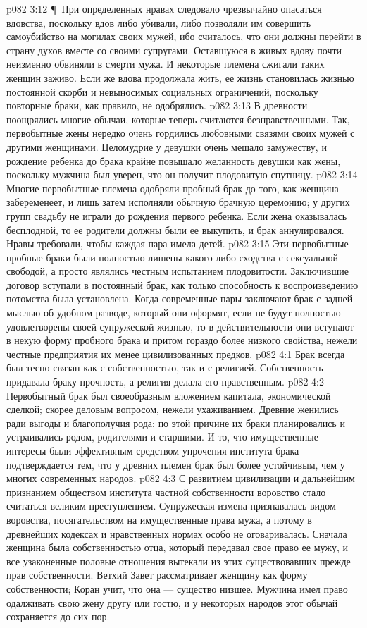 \vs p082 3:12 \P\ При определенных нравах следовало чрезвычайно опасаться вдовства, поскольку вдов либо убивали, либо позволяли им совершить самоубийство на могилах своих мужей, ибо считалось, что они должны перейти в страну духов вместе со своими супругами. Оставшуюся в живых вдову почти неизменно обвиняли в смерти мужа. И некоторые племена сжигали таких женщин заживо. Если же вдова продолжала жить, ее жизнь становилась жизнью постоянной скорби и невыносимых социальных ограничений, поскольку повторные браки, как правило, не одобрялись.
\vs p082 3:13 В древности поощрялись многие обычаи, которые теперь считаются безнравственными. Так, первобытные жены нередко очень гордились любовными связями своих мужей с другими женщинами. Целомудрие у девушки очень мешало замужеству, и рождение ребенка до брака крайне повышало желанность девушки как жены, поскольку мужчина был уверен, что он получит плодовитую спутницу.
\vs p082 3:14 Многие первобытные племена одобряли пробный брак до того, как женщина забеременеет, и лишь затем исполняли обычную брачную церемонию; у других групп свадьбу не играли до рождения первого ребенка. Если жена оказывалась бесплодной, то ее родители должны были ее выкупить, и брак аннулировался. Нравы требовали, чтобы каждая пара имела детей.
\vs p082 3:15 Эти первобытные пробные браки были полностью лишены какого\hyp{}либо сходства с сексуальной свободой, а просто являлись честным испытанием плодовитости. Заключившие договор вступали в постоянный брак, как только способность к воспроизведению потомства была установлена. Когда современные пары заключают брак с задней мыслью об удобном разводе, который они оформят, если не будут полностью удовлетворены своей супружеской жизнью, то в действительности они вступают в некую форму пробного брака и притом гораздо более низкого свойства, нежели честные предприятия их менее цивилизованных предков.
\vs p082 4:1 Брак всегда был тесно связан как с собственностью, так и с религией. Собственность придавала браку прочность, а религия делала его нравственным.
\vs p082 4:2 Первобытный брак был своеобразным вложением капитала, экономической сделкой; скорее деловым вопросом, нежели ухаживанием. Древние женились ради выгоды и благополучия рода; по этой причине их браки планировались и устраивались родом, родителями и старшими. И то, что имущественные интересы были эффективным средством упрочения института брака подтверждается тем, что у древних племен брак был более устойчивым, чем у многих современных народов.
\vs p082 4:3 С развитием цивилизации и дальнейшим признанием обществом института частной собственности воровство стало считаться великим преступлением. Супружеская измена признавалась видом воровства, посягательством на имущественные права мужа, а потому в древнейших кодексах и нравственных нормах особо не оговаривалась. Сначала женщина была собственностью отца, который передавал свое право ее мужу, и все узаконенные половые отношения вытекали из этих существовавших прежде прав собственности. Ветхий Завет рассматривает женщину как форму собственности; Коран учит, что она --- существо низшее. Мужчина имел право одалживать свою жену другу или гостю, и у некоторых народов этот обычай сохраняется до сих пор.
